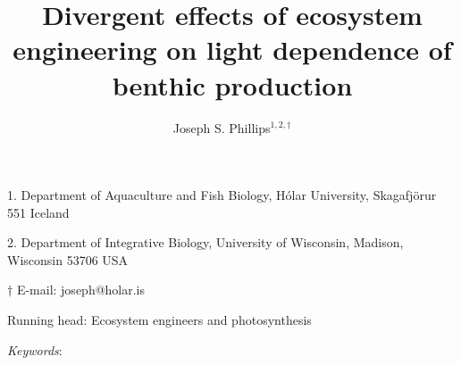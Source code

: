 \documentclass[12pt]{article}
\title{Divergent effects of ecosystem engineering on light dependence of benthic production}
\author{
Joseph S. Phillips$^{1,2,\dagger}$}
\date{}
\begin{document}
\raggedright
\setlength\parindent{0.25in}

\maketitle

\noindent{} 1. Department of Aquaculture and Fish Biology, H\'{o}lar University, Skagafj\"{o}r{\dh}ur 551 Iceland

\noindent{} 2. Department of Integrative Biology, University of Wisconsin, Madison, Wisconsin 53706 USA

\noindent{} $\dagger$ E-mail: joseph@holar.is

\bigskip

Running head: {Ecosystem engineers and photosynthesis}

\linenumbers{}

\clearpage















\bigskip

\textit{Keywords}: {}





\end{document}

